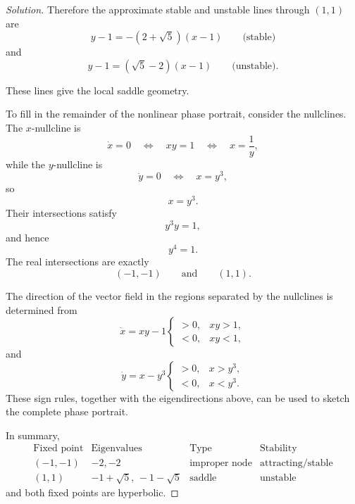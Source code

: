 \documentclass[12pt]{amsart}
\theoremstyle{conjecture}
\theoremstyle{definition}
\theoremstyle{question}
\theoremstyle{theorem}
\newenvironment{solution}
{\begin{proof}[Solution]}
{\end{proof}}
\begin{document}
\begin{solution}
        Therefore the approximate stable and unstable lines through $(1,1)$
        are
        \[
            \boxed{
                y-1=-(2+\sqrt{5})(x-1)
                \qquad\text{(stable)}}
        \]
        and
        \[
            \boxed{
                y-1=(\sqrt{5}-2)(x-1)
                \qquad\text{(unstable)}.}
        \]

        These lines give the local saddle geometry.

        To fill in the remainder of the nonlinear phase portrait, consider
        the nullclines.  The $x$-nullcline is
        \[
            \dot{x}=0
            \quad\Longleftrightarrow\quad
            xy=1
            \quad\Longleftrightarrow\quad
            \boxed{x=\frac{1}{y}},
        \]
        while the $y$-nullcline is
        \[
            \dot{y}=0
            \quad\Longleftrightarrow\quad
            x=y^3,
        \]
        so
        \[
            \boxed{x=y^3.}
        \]
        Their intersections satisfy
        \[
            y^3y=1,
        \]
        and hence
        \[
            y^4=1.
        \]
        The real intersections are exactly
        \[
            (-1,-1)
            \qquad\text{and}\qquad
            (1,1).
        \]

        The direction of the vector field in the regions separated by the
        nullclines is determined from
        \[
            \dot{x}=xy-1
            \begin{cases}
                >0,&xy>1,\\
                <0,&xy<1,
            \end{cases}
        \]
        and
        \[
            \dot{y}=x-y^3
            \begin{cases}
                >0,&x>y^3,\\
                <0,&x<y^3.
            \end{cases}
        \]
        These sign rules, together with the eigendirections above, can be
        used to sketch the complete phase portrait.

        In summary,
        \[
            \boxed{
                \begin{array}{c|c|c|c}
                    \text{Fixed point} & \text{Eigenvalues} & \text{Type}
                    & \text{Stability}\\ \hline
                    (-1,-1) & -2,-2
                    & \text{improper node}
                    & \text{attracting/stable}\\[2mm]
                    (1,1) & -1+\sqrt5,\,-1-\sqrt5
                    & \text{saddle}
                    & \text{unstable}
                \end{array}}
        \]
        and both fixed points are hyperbolic.
    \end{solution}
\end{document}
